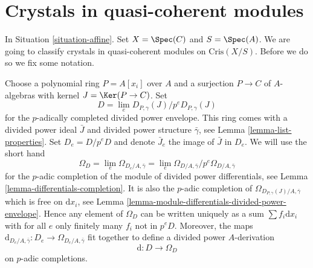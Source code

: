 \section{Crystals in quasi-coherent modules}
\label{section-quasi-coherent-crystals}

\noindent
In Situation \ref{situation-affine}.
Set $X = \Spec(C)$ and $S = \Spec(A)$. We are going to
classify crystals in quasi-coherent modules on $\text{Cris}(X/S)$.
Before we do so we fix some notation.

\medskip\noindent
Choose a polynomial ring $P = A[x_i]$ over $A$ and a surjection $P \to C$
of $A$-algebras with kernel $J = \Ker(P \to C)$. Set
\begin{equation}
\label{equation-D}
D = \lim_e D_{P, \gamma}(J) / p^eD_{P, \gamma}(J)
\end{equation}
for the $p$-adically completed divided power envelope.
This ring comes with a divided power ideal $\bar J$ and divided power
structure $\bar \gamma$, see Lemma \ref{lemma-list-properties}.
Set $D_e = D/p^eD$ and denote $\bar J_e$ the image of $\bar J$ in $D_e$.
We will use the short hand
\begin{equation}
\label{equation-omega-D}
\Omega_D = \lim_e \Omega_{D_e/A, \bar\gamma} =
\lim_e \Omega_{D/A, \bar\gamma}/p^e\Omega_{D/A, \bar\gamma}
\end{equation}
for the $p$-adic completion of the module of divided power differentials,
see Lemma \ref{lemma-differentials-completion}.
It is also the $p$-adic completion of
$\Omega_{D_{P, \gamma}(J)/A, \bar\gamma}$
which is free on $\text{d}x_i$, see
Lemma \ref{lemma-module-differentials-divided-power-envelope}.
Hence any element of $\Omega_D$ can be written uniquely as a sum
$\sum f_i\text{d}x_i$ with for all $e$ only finitely many $f_i$
not in $p^eD$. Moreover, the maps
$\text{d}_{D_e/A, \bar\gamma} : D_e \to \Omega_{D_e/A, \bar\gamma}$
fit together to define a divided power $A$-derivation
\begin{equation}
\label{equation-derivation-D}
\text{d} : D \longrightarrow \Omega_D
\end{equation}
on $p$-adic completions.

